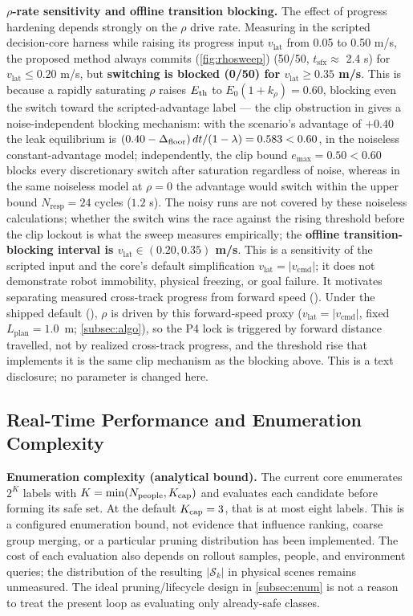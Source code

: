 \noindent\textbf{$\rho$-rate sensitivity and offline transition blocking.} The effect of progress hardening depends strongly on the $\rho$ drive rate. Measuring in the scripted  decision-core harness while raising its progress input $v_{\text{lat}}$ from 0.05 to 0.50 m/s, the proposed method always commits (\cref{fig:rhosweep}) (50/50, $t_{\text{sfx}} \approx$ 2.4 s) for $v_{\text{lat}} \le 0.20$ m/s, but \textbf{switching is blocked (0/50) for $v_{\text{lat}} \ge 0.35$ m/s}. This is because a rapidly saturating $\rho$ raises $E_{\text{th}}$ to $E_0(1+k_\rho) = 0.60$, blocking even the switch toward the scripted-advantage label --- the clip obstruction in  gives a noise-independent blocking mechanism: with the scenario's advantage of $+0.40$ the leak equilibrium is $(0.40-\Delta_{\text{floor}})\,dt/(1-\lambda) = 0.583 < 0.60$, in the noiseless constant-advantage model; independently, the clip bound $e_{\max}=0.50<0.60$ blocks every discretionary switch after saturation regardless of noise, whereas in the same noiseless model at $\rho = 0$ the advantage would switch within the upper bound $N_{\text{resp}} = 24$ cycles ($1.2$ s). The noisy runs are not covered by these noiseless calculations; whether the switch wins the race against the rising threshold before the clip lockout is what the sweep measures empirically; the \textbf{offline transition-blocking interval is $v_{\text{lat}} \in (0.20, 0.35)$ m/s}. This is a sensitivity of the scripted input and the core's default simplification $v_{\text{lat}}=|v_{\text{cmd}}|$; it does not demonstrate robot immobility, physical freezing, or goal failure. It motivates separating measured cross-track progress from forward speed (). Under the shipped default (), $\rho$ is driven by this forward-speed proxy ($v_{\text{lat}}=|v_{\text{cmd}}|$, fixed $L_{\text{plan}}=1.0$~m; \cref{subsec:algo}), so the P4 lock is triggered by forward distance travelled, not by realized cross-track progress, and the threshold rise that implements it is the same clip mechanism as the blocking above. This is a text disclosure; no parameter is changed here.

\subsection{Real-Time Performance and Enumeration Complexity}\label{subsec:latency}



\noindent\textbf{Enumeration complexity (analytical bound).} The current core enumerates $2^K$ labels with $K=\min(N_{\rm people},K_{\rm cap})$ and evaluates each candidate before forming its safe set. At the default $K_{\rm cap}=3$, that is at most eight labels. This is a configured enumeration bound, not evidence that influence ranking, coarse group merging, or a particular pruning distribution has been implemented. The cost of each evaluation also depends on rollout samples, people, and environment queries; the distribution of the resulting $|\mathcal{S}_k|$ in physical scenes remains unmeasured. The ideal pruning/lifecycle design in \cref{subsec:enum} is not a reason to treat the present loop as evaluating only already-safe classes.

